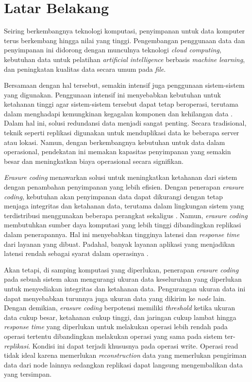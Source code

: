 \section{Latar Belakang}
\label{sec:latar-belakang}

Seiring berkembangnya teknologi komputasi, penyimpanan untuk data komputer terus berkembang hingga nilai yang tinggi. Pengembangan penggunaan data dan penyimpanan ini didorong dengan munculnya teknologi \textit{cloud computing}, kebutuhan data untuk pelatihan \textit{artificial intelligence} berbasis \textit{machine learning}, dan peningkatan kualitas data secara umum pada \textit{file}.

Bersamaan dengan hal tersebut, semakin intensif juga penggunaan sistem-sistem yang digunakan. Penggunaan intensif ini menyebabkan kebutuhan untuk ketahanan tinggi agar sistem-sistem tersebut dapat tetap beroperasi, terutama dalam menghadapi kemungkinan kegagalan komponen dan kehilangan data \parencite{weatherspoon2002erasure}. Dalam hal ini, solusi redundansi data menjadi sangat penting. Secara tradisional, teknik seperti replikasi digunakan untuk menduplikasi data ke beberapa server atau lokasi. Namun, dengan berkembangnya kebutuhan untuk data dalam operasional, pendekatan ini memakan kapasitas penyimpanan yang semakin besar dan meningkatkan biaya operasional secara signifikan.

\textit{Erasure coding} menawarkan solusi untuk meningkatkan ketahanan dari sistem dengan penambahan penyimpanan yang lebih efisien. Dengan penerapan \textit{erasure coding}, kebutuhan akan penyimpanan data dapat dikurangi dengan tetap menjaga integritas dan ketahanan data, terutama dalam lingkungan sistem yang terdistribusi menggunakan beberapa perangkat sekaligus \parencite{balaji2018erasure}. Namun, \textit{erasure coding} membutuhkan sumber daya komputasi yang lebih tinggi dibandingkan replikasi dalam penerapannya. Hal ini menyebabkan tingginya latensi dan \textit{response time} dari layanan yang dibuat. Padahal, banyak layanan aplikasi yang menjadikan latensi rendah sebagai syarat dalam operasinya \parencite{dean2013tail}.

Akan tetapi, di samping komputasi yang diperlukan, penerapan \textit{erasure coding} pada sebuah sistem akan mengurangi ukuran data keseluruhan yang diperlukan untuk menyediakan integritas dan ketahanan data. Pengurangan ukuran data ini dapat menyebabkan turunnya juga ukuran data yang dikirim ke \textit{node} lain. Dengan demikian, \textit{erasure coding} berpotensi memiliki \textit{threshold} ketika ukuran data cukup besar, ketahanan cukup tinggi, dan jaringan cukup lambat hingga \textit{response time} yang diperlukan untuk melakukan operasi lebih rendah pada operasi tertentu dibandingkan melakukan operasi yang sama pada sistem ter-\textit{replikasi}. Kondisi ini dapat terjadi khususnya pada operasi write. Operasi read tidak ideal karena memerlukan \textit{reconstruction} data yang memerlukan pengiriman data dari node lainnya sedangkan replikasi dapat langsung mengembalikan data yang tersimpan.

